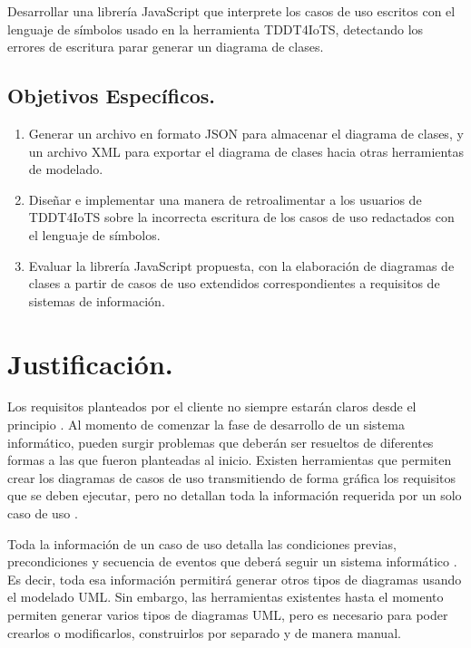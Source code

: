 Desarrollar una librería JavaScript que interprete los casos de uso escritos con el lenguaje de símbolos usado en la herramienta TDDT4IoTS, detectando los errores de escritura parar generar un diagrama de clases. 

\subsection{Objetivos Específicos.}

\begin{enumerate}
	\item Generar un archivo en formato JSON para almacenar el diagrama de clases, y un archivo XML para exportar el diagrama de clases hacia otras herramientas de modelado.
	
	\item Diseñar e implementar una manera de retroalimentar a los usuarios de TDDT4IoTS sobre la incorrecta escritura de los casos de uso redactados con el lenguaje de símbolos. 
	
	\item Evaluar la librería JavaScript propuesta, con la elaboración de diagramas de clases a partir de casos de uso extendidos correspondientes a requisitos de sistemas de información.
\end{enumerate}

\section{Justificación.}

Los requisitos planteados por el cliente no siempre estarán claros desde el principio \parencite{iqbal2020}. Al momento de comenzar la fase de desarrollo de un sistema informático, pueden surgir problemas que deberán ser resueltos de diferentes formas a las que fueron planteadas al inicio. Existen herramientas que permiten crear los diagramas de casos de uso transmitiendo de forma gráfica los requisitos que se deben ejecutar, pero no detallan toda la información requerida por un solo caso de uso \parencite{Abdelnabi2021}.

Toda la información de un caso de uso detalla las condiciones previas, precondiciones y secuencia de eventos que deberá seguir un sistema informático \parencite{iqbal2020}. Es decir, toda esa información permitirá generar otros tipos de diagramas usando el modelado UML. Sin embargo, las herramientas existentes hasta el momento permiten generar varios tipos de diagramas UML, pero es necesario para poder crearlos o modificarlos, construirlos por separado y de manera manual.

